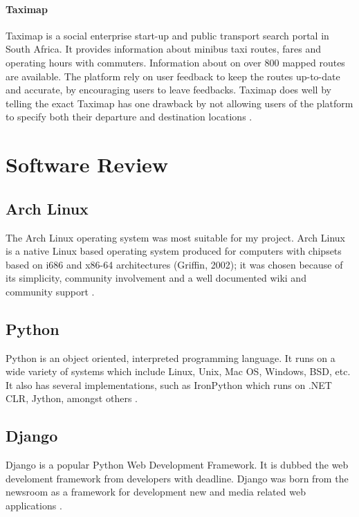 
\paragraph{Taximap}
Taximap is a social enterprise start-up and public transport search portal in South Africa. It provides information about minibus taxi routes, fares and operating hours with commuters. Information about on over 800 mapped routes are available. The platform rely on user feedback to keep the routes up-to-date and accurate, by encouraging users to leave feedbacks. Taximap does well by telling the exact Taximap has one drawback by not allowing users of the platform to specify both their departure and destination locations \citep{neumann_toward_2015}.

\section{Software Review}

\subsection{Arch Linux}
The Arch Linux operating system was most suitable for my project. Arch Linux is a native Linux based operating system produced for computers with chipsets based on i686 and x86-64 architectures (Griffin, 2002); it was chosen because of its simplicity, community involvement and a well documented wiki and community support \citep{vinet2014arch}.

\subsection{Python}
Python is an object oriented, interpreted programming language. It runs on a wide variety of systems which include Linux, Unix, Mac OS, Windows, BSD, etc. It also has several implementations, such as IronPython which runs on .NET CLR, Jython, amongst others \citep{van2007python}. 

\subsection{Django}
Django is a popular Python Web Development Framework. It is dubbed the web develoment framework from developers with deadline. Django was born from the newsroom as a framework for development new and media related web applications \citep{holovaty2009definitive}.


